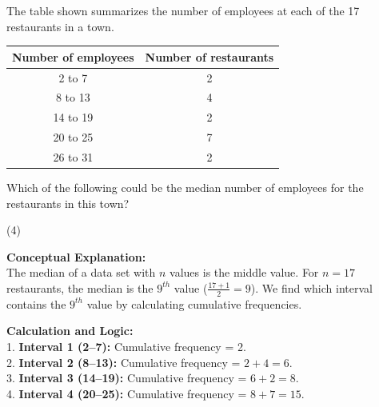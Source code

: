 \documentclass[11pt,paper=a4,answers]{exam}
\begin{document}
\begin{questions}
\pointsinrightmargin
\pointsdroppedatright
\marksnotpoints
{}
\pointformat{\boldmath\themarginpoints}
\bracketedpoints


\question
The table shown summarizes the number of employees at each of the 17 restaurants in a town.
\begin{center}
\begin{tabular}{|c|c|}
\hline
Number of employees & Number of restaurants \\ \hline
2 to 7 & 2 \\ \hline
8 to 13 & 4 \\ \hline
14 to 19 & 2 \\ \hline
20 to 25 & 7 \\ \hline
26 to 31 & 2 \\ \hline
\end{tabular}
\end{center}
Which of the following could be the median number of employees for the restaurants in this town?
\begin{tasks}(4)
\end{tasks}

\begin{solution}
\textbf{Conceptual Explanation:} \\
The median of a data set with $n$ values is the middle value. For $n=17$ restaurants, the median is the $9^{th}$ value ($ \frac{17+1}{2} = 9 $). We find which interval contains the $9^{th}$ value by calculating cumulative frequencies.

\vspace{30pt}

\textbf{Calculation and Logic:} \\
1. \textbf{Interval 1 (2--7):} Cumulative frequency = 2. \\
2. \textbf{Interval 2 (8--13):} Cumulative frequency = $2 + 4 = 6$. \\
3. \textbf{Interval 3 (14--19):} Cumulative frequency = $6 + 2 = 8$. \\
4. \textbf{Interval 4 (20--25):} Cumulative frequency = $8 + 7 = 15$.


\end{solution}
\end{questions}
\end{document}
